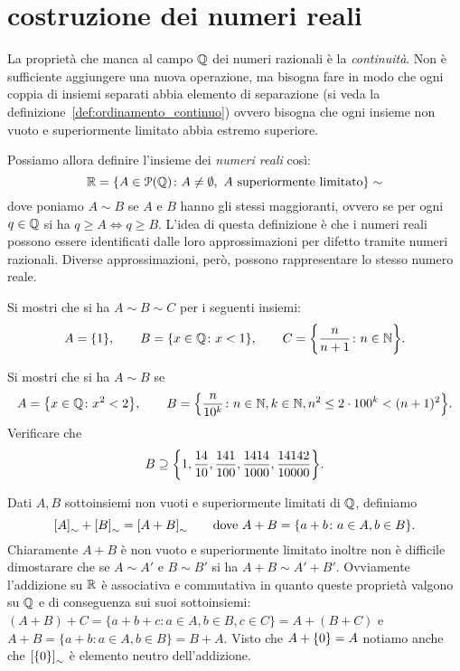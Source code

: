 \section{costruzione dei numeri reali}
\label{sec:costruzione_reali}

La proprietà che manca al campo ${\mathbb Q}$ dei numeri razionali 
è la \emph{continuità}. 
Non è sufficiente aggiungere una nuova operazione, ma bisogna 
fare in modo che ogni coppia di insiemi separati 
abbia elemento di separazione 
(si veda la definizione~\ref{def:ordinamento_continuo})
ovvero bisogna che ogni insieme non vuoto e superiormente 
limitato abbia estremo superiore.

Possiamo allora definire l'insieme dei \emph{numeri reali}
così:
%
%
%
\[
{\mathbb R} = {\left\{ A \in \mathcal P({\mathbb Q})\colon A\neq \emptyset, \text{ $A$ superiormente 
limitato} \right\}}\sim
\]
dove poniamo $A\sim B$ 
se $A$ e $B$ hanno gli stessi maggioranti, ovvero
se per ogni $q\in {\mathbb Q}$ si ha $q\ge A \iff q\ge B$.
L'idea di questa definizione è che i numeri reali 
possono essere identificati dalle loro approssimazioni 
per difetto tramite numeri razionali. 
Diverse approssimazioni, però, possono rappresentare 
lo stesso numero reale.

\begin{exercise}
  Si mostri che si ha $A \sim B \sim C$
  per i seguenti insiemi:
  \[
  A = {\left\{ 1 \right\}}, \qquad 
  B = {\left\{ x\in {\mathbb Q}\colon x<1 \right\}}, \qquad
  C = {\left\{ \frac{n}{n+1}\colon n\in {\mathbb N} \right\}}.
  \]
\end{exercise}

\begin{exercise}
  Si mostri che si ha $A\sim B$ se
  \[
  A = {\left\{ x\in {\mathbb Q}\colon x^2<2 \right\}}, \qquad
  B = {\left\{ \frac{n}{10^k}\colon n\in {\mathbb N}, k\in {\mathbb N}, n^2 \le 2\cdot 100^k < (n+1)^2 \right\}}.  
  \]
  Verificare che 
  \[
    B \supseteq {\left\{ 
      1,\frac{14}{10},\frac{141}{100},\frac{1414}{1000},
      \frac{14142}{10000} \right\}}.
  \]
\end{exercise}

Dati $A,B$ sottoinsiemi non vuoti e superiormente limitati di ${\mathbb Q}$, 
definiamo 
\[
  {\left[ A \right]}_\sim+{\left[ B \right]}_\sim
  = {\left[ A+B \right]}_\sim
  \qquad\text{dove $A+B = {\left\{ a+b\colon a \in A, b \in B \right\}}$.}
\]
Chiaramente $A+B$ è non vuoto e superiormente limitato
inoltre non è difficile dimostarare che 
se $A\sim A'$ e $B\sim B'$ si ha $A+B\sim A'+B'$.
Ovviamente l'addizione su ${\mathbb R}$ è associativa e commutativa in quanto 
queste proprietà valgono su ${\mathbb Q}$ e di conseguenza sui suoi sottoinsiemi:
$(A+B)+C = \{ a+b+c\colon a\in A, b\in B, c\in C\} = A + (B+C)$ e 
$A+B = \{a+b\colon a\in A, b\in B\} = B+A$.
Visto che $A+{\left\{ 0 \right\}} = A$ notiamo anche che ${\left[ {\left\{ 0 \right\}} \right]}_\sim$ 
è elemento neutro dell'addizione.

